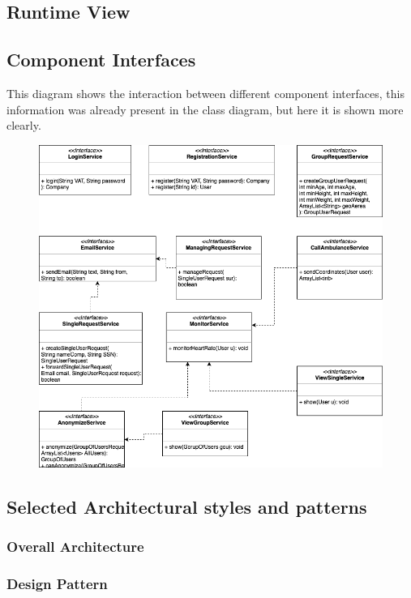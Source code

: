 \documentclass{article}
\begin{document}
\subsection{Runtime View}
\newpage
\subsection{Component Interfaces}
This diagram shows the interaction between different component interfaces, this information was already present in the class diagram, but here it is shown more clearly.
\begin{figure}[h!]
\centering
    \textbf{}\par\medskip
	\includegraphics[width= \linewidth]{inter.png}
\end{figure}
\newpage
\subsection{Selected Architectural styles and patterns}
\subsubsection{Overall Architecture}

\subsubsection{Design Pattern}
\end{document}
